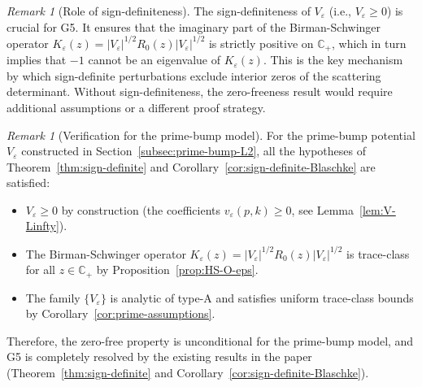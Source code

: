﻿\documentclass[12pt,a4paper]{article}
\theoremstyle{definition}
\theoremstyle{remark}
\newtheorem{remark}[theorem]{Remark}
\newcommand{\CC}{\mathbb{C}}
\begin{document}
\begin{remark}[Role of sign-definiteness]
\label{rem:role-sign-definiteness}
The sign-definiteness of $V_\varepsilon$ (i.e., $V_\varepsilon \geq 0$) is crucial for G5. It ensures that the imaginary part of the Birman-Schwinger operator $K_\varepsilon(z) = |V_\varepsilon|^{1/2} R_0(z) |V_\varepsilon|^{1/2}$ is strictly positive on $\CC_+$, which in turn implies that $-1$ cannot be an eigenvalue of $K_\varepsilon(z)$. This is the key mechanism by which sign-definite perturbations exclude interior zeros of the scattering determinant. Without sign-definiteness, the zero-freeness result would require additional assumptions or a different proof strategy.
\end{remark}

\begin{remark}[Verification for the prime-bump model]
\label{rem:prime-bump-verification-G5}
For the prime-bump potential $V_\varepsilon$ constructed in Section~\ref{subsec:prime-bump-L2}, all the hypotheses of Theorem~\ref{thm:sign-definite} and Corollary~\ref{cor:sign-definite-Blaschke} are satisfied:
\begin{itemize}
\item $V_\varepsilon \geq 0$ by construction (the coefficients $v_\varepsilon(p,k) \geq 0$, see Lemma~\ref{lem:V-Linfty}).
\item The Birman-Schwinger operator $K_\varepsilon(z) = |V_\varepsilon|^{1/2} R_0(z) |V_\varepsilon|^{1/2}$ is trace-class for all $z \in \CC_+$ by Proposition~\ref{prop:HS-O-eps}.
\item The family $\{V_\varepsilon\}$ is analytic of type-A and satisfies uniform trace-class bounds by Corollary~\ref{cor:prime-assumptions}.
\end{itemize}
Therefore, the zero-free property is unconditional for the prime-bump model, and G5 is completely resolved by the existing results in the paper (Theorem~\ref{thm:sign-definite} and Corollary~\ref{cor:sign-definite-Blaschke}).
\end{remark}
\end{document}
